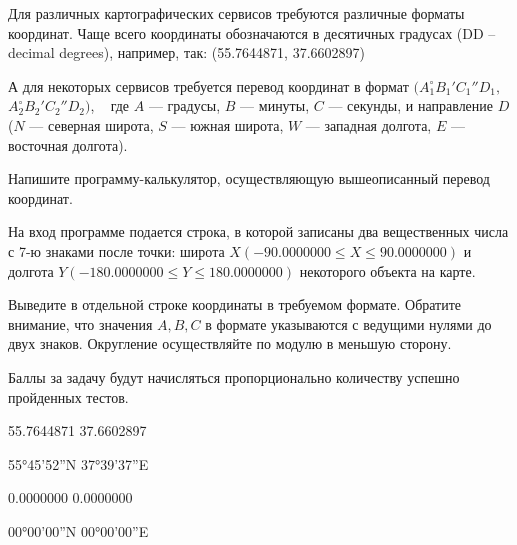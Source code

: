 
Для различных картографических сервисов требуются различные форматы координат. Чаще всего 
координаты обозначаются в десятичных градусах (DD -- decimal degrees), например, так:
(55.7644871, 37.6602897)  

А для некоторых сервисов требуется перевод координат в формат $(A_1^{\circ}B_1'C_1''D_1,$ $A_2^{\circ}B_2'C_2''D_2)$,  
где $A$  — градусы, $B$  — минуты, $C$  — секунды, и направление $D$  ($N$  — северная широта, $S$  — южная широта,
 $W$  — западная долгота, $E$  — восточная долгота).
 
Напишите программу-калькулятор, осуществляющую вышеописанный перевод координат. 

На вход программе подается строка, в которой записаны два вещественных числа с 7-ю знаками после точки: широта 
$X(-90.0000000 \leq X \leq 90.0000000)$ и долгота $Y(-180.0000000 \leq Y \leq 180.0000000)$ некоторого объекта на карте.

\outputfmtSection
Выведите в отдельной строке координаты в требуемом формате. Обратите внимание, что значения $A , B , C$  в формате указываются с ведущими нулями до двух знаков. Округление осуществляйте по модулю в меньшую сторону.

\markSection

Баллы за задачу будут начисляться пропорционально количеству успешно пройденных тестов.


\begin{myverbbox}[\small]{\vinput}
    55.7644871 37.6602897
\end{myverbbox}
\begin{myverbbox}[\small]{\voutput}
   55°45'52''N 37°39'37''E
\end{myverbbox}


\begin{myverbbox}[\small]{\vinput}
    0.0000000 0.0000000
\end{myverbbox}
\begin{myverbbox}[\small]{\voutput}
   00°00'00''N 00°00'00''E
\end{myverbbox}

